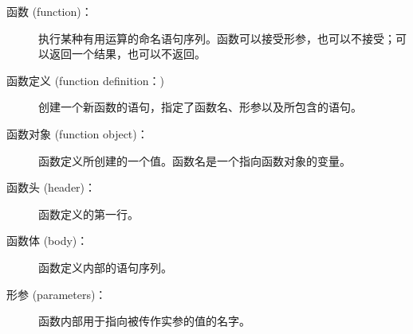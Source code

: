 \begin{description}


\item[函数 (function)：] 执行某种有用运算的命名语句序列。函数可以接受形参，也可以不接受；可以返回一个结果，也可以不返回。
  


\item[函数定义 (function definition：)] 创建一个新函数的语句，指定了函数名、形参以及所包含的语句。
  


\item[函数对象 (function object)：] 函数定义所创建的一个值。函数名是一个指向函数对象的变量。
  


\item[函数头 (header)：] 函数定义的第一行。
  


\item[函数体 (body)：] 函数定义内部的语句序列。
  


\item[形参 (parameters)：] 函数内部用于指向被传作实参的值的名字。
  


\end{description}

